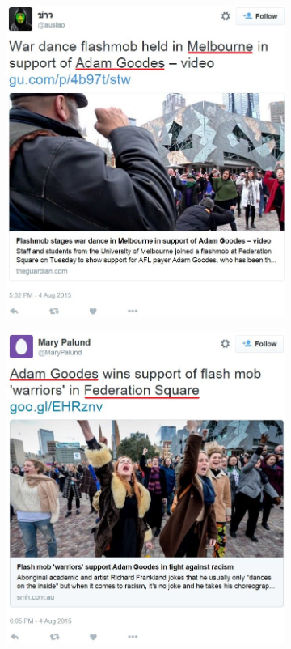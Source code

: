 \documentclass[a4paper,12pt]{report}
\begin{document}
\begin{figure}
    \centering
    \begin{subfigure}[b]{0.45\textwidth}
        \centering
        \includegraphics[width=\textwidth]{tweetA}
        \caption{}
        \label{fig:tweeta}
    \end{subfigure}
    \hfill
    \begin{subfigure}[b]{0.45\textwidth}
        \centering
        \includegraphics[width=\textwidth]{tweetB}
       \caption{}
        \label{fig:tweetb}
    \end{subfigure}
    \hfill
    

\end{figure}
\end{document}
